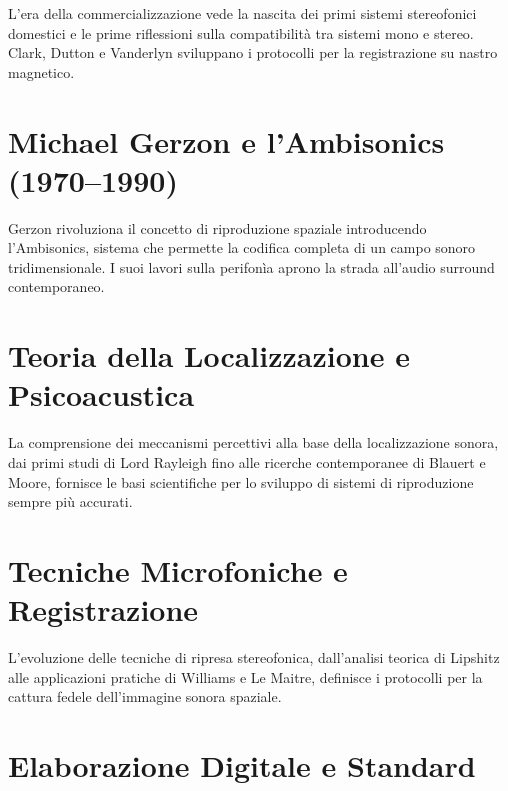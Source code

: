 \documentclass[11pt,a4paper]{article}
\begin{document}
L'era della commercializzazione vede la nascita dei primi sistemi stereofonici domestici e le prime riflessioni sulla compatibilità tra sistemi mono e stereo. Clark, Dutton e Vanderlyn sviluppano i protocolli per la registrazione su nastro magnetico.

\nocite{clark1957}
\nocite{klapholz1958}
\nocite{bauer1961}
\nocite{schroeder1961}
\nocite{cooper1960}

\section{Michael Gerzon e l'Ambisonics (1970--1990)}

Gerzon rivoluziona il concetto di riproduzione spaziale introducendo l'Ambisonics, sistema che permette la codifica completa di un campo sonoro tridimensionale. I suoi lavori sulla perifonìa aprono la strada all'audio surround contemporaneo.

\nocite{gerzon1973}
\nocite{gerzon1975}
\nocite{gerzon1977}
\nocite{gerzon1992}

\section{Teoria della Localizzazione e Psicoacustica}

La comprensione dei meccanismi percettivi alla base della localizzazione sonora, dai primi studi di Lord Rayleigh fino alle ricerche contemporanee di Blauert e Moore, fornisce le basi scientifiche per lo sviluppo di sistemi di riproduzione sempre più accurati.

\nocite{rayleigh1907}
\nocite{mills1958}
\nocite{blauert1969}
\nocite{blauert1983}
\nocite{moore1995}

\section{Tecniche Microfoniche e Registrazione}

L'evoluzione delle tecniche di ripresa stereofonica, dall'analisi teorica di Lipshitz alle applicazioni pratiche di Williams e Le Maitre, definisce i protocolli per la cattura fedele dell'immagine sonora spaziale.

\nocite{lipshitz1986}
\nocite{williams1987}
\nocite{joseph2007}

\section{Elaborazione Digitale e Standard}
\end{document}
